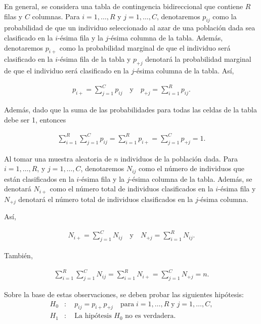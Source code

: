 \documentclass{book}
\begin{document}
En general, se considera una tabla de contingencia bidireccional que contiene $R$ filas y $C$ columnas. Para $i = 1, \ldots, R$ y $j = 1, \ldots, C$, denotaremos $p_{ij}$ como la probabilidad de que un individuo seleccionado al azar de una población dada sea clasificado en la $i$-ésima fila y la $j$-ésima columna de la tabla. Además, denotaremos $p_{i+}$ como la probabilidad marginal de que el individuo será clasificado en la $i$-ésima fila de la tabla y $p_{+j}$ denotará la probabilidad marginal de que el individuo será clasificado en la $j$-ésima columna de la tabla. Así,

\begin{align}
p_{i+} = \sum_{j=1}^{C} p_{ij} \quad \text{y} \quad p_{+j} = \sum_{i=1}^{R} p_{ij}.
\end{align}

Además, dado que la suma de las probabilidades para todas las celdas de la tabla debe ser 1, entonces

\begin{align}
\sum_{i=1}^{R} \sum_{j=1}^{C} p_{ij} = \sum_{i=1}^{R} p_{i+} = \sum_{j=1}^{C} p_{+j} = 1.
\end{align}

Al tomar una muestra aleatoria de $n$ individuos de la población dada. Para $i = 1, \ldots, R$, y $j = 1, \ldots, C$, denotaremos $N_{ij}$ como el número de individuos que están clasificados en la $i$-ésima fila y la $j$-ésima columna de la tabla. Además, se denotará $N_{i+}$ como el número total de individuos clasificados en la $i$-ésima fila y $N_{+j}$ denotará el número total de individuos clasificados en la $j$-ésima columna.

Así,

\begin{align}
N_{i+} = \sum_{j=1}^{C} N_{ij} \quad \text{y} \quad N_{+j} = \sum_{i=1}^{R} N_{ij}.
\end{align}

También,

\begin{align}
\sum_{i=1}^{R} \sum_{j=1}^{C} N_{ij} = \sum_{i=1}^{R} N_{i+} = \sum_{j=1}^{C} N_{+j} = n.
\end{align}

Sobre la base de estas observaciones, se deben probar las siguientes hipótesis:
\begin{align}
H_0&: \quad p_{ij} = p_{i+}p_{+j} \quad \text{para} \; i = 1, \ldots, R \; \text{y} \; j = 1, \ldots, C, \\
H_1&: \quad \text{La hipótesis } H_0 \text{ no es verdadera.}
\end{align}
\end{document}
